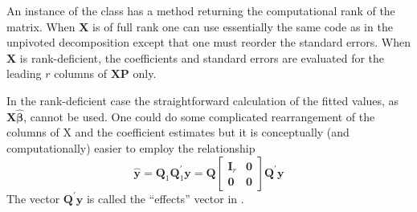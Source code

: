 \documentclass[shortnames,article]{jss}
\begin{document}
An instance of the class  has a
 method returning the computational rank of the matrix.
When $\bm X$ is of full rank one can use essentially the same code as
in the unpivoted decomposition except that one must reorder the
standard errors.  When $\bm X$ is rank-deficient, the
coefficients and standard errors are evaluated for the leading $r$ columns of $\bm
X\bm P$ only.

In the rank-deficient case the straightforward calculation of the
fitted values, as $\bm X\widehat{\bm\beta}$, cannot be used.  One
could do some complicated rearrangement of the columns of X and the
coefficient estimates but it is conceptually (and computationally)
easier to employ the relationship
\begin{displaymath}
  \widehat{\bm y} = \bm Q_1\bm Q_1^\prime\bm y=\bm Q
  \begin{bmatrix}
    \bm I_r & \bm 0\\
    \bm 0   & \bm 0
  \end{bmatrix}
  \bm Q^\prime\bm y
\end{displaymath}
The vector $\bm Q^\prime\bm y$ is called the ``effects'' vector in .
\end{document}
